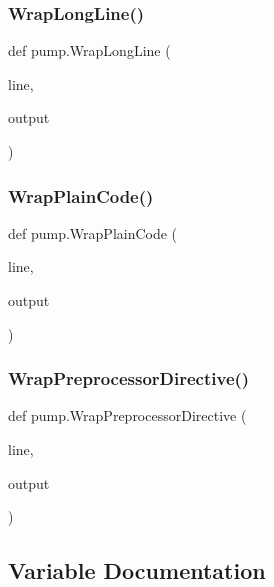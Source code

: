 \mbox{\label{namespacepump_a02427e2ddc80f0f408e27dfc3e38e702}} 
\subsubsection{\texorpdfstring{WrapLongLine()}{WrapLongLine()}}
{\footnotesize\ttfamily def pump.\+Wrap\+Long\+Line (\begin{DoxyParamCaption}\item[{}]{line,  }\item[{}]{output }\end{DoxyParamCaption})}

\mbox{\label{namespacepump_a60723738cc38d8ced7e2cfecc72d8b11}} 
\subsubsection{\texorpdfstring{WrapPlainCode()}{WrapPlainCode()}}
{\footnotesize\ttfamily def pump.\+Wrap\+Plain\+Code (\begin{DoxyParamCaption}\item[{}]{line,  }\item[{}]{output }\end{DoxyParamCaption})}

\mbox{\label{namespacepump_a59e8ae06bae068d2d72df4f0340635d8}} 
\subsubsection{\texorpdfstring{WrapPreprocessorDirective()}{WrapPreprocessorDirective()}}
{\footnotesize\ttfamily def pump.\+Wrap\+Preprocessor\+Directive (\begin{DoxyParamCaption}\item[{}]{line,  }\item[{}]{output }\end{DoxyParamCaption})}



\subsection{Variable Documentation}
\mbox{\label{namespacepump_ab99a065546038823261c774117df0798}} 

